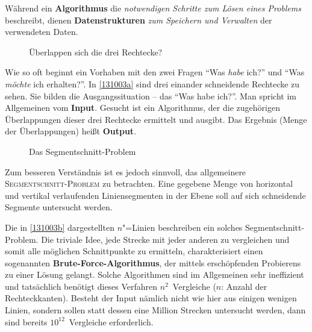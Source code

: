 \documentclass[ngerman,draft,parskip=half*,twoside]{scrreprt}
\theoremstyle{break}
\begin{document}
Während ein \textbf{Algorithmus} die \emph{notwendigen Schritte zum Lösen
eines Problems} beschreibt, dienen \textbf{Datenstrukturen}
\emph{zum Speichern und Verwalten} der verwendeten Daten.  

\begin{figure}
  \centering
%  
  \caption{Überlappen sich die drei Rechtecke?}
  \label{131003a}
\end{figure}

Wie so oft beginnt ein Vorhaben mit den zwei Fragen "`Was \emph{habe}
ich?"' und "`Was \emph{möchte} ich erhalten?"'. In \autoref{131003a}
sind drei einander schneidende Rechtecke zu sehen. Sie bilden die
Ausgangssituation -- das "`Was habe ich?"'. Man spricht im Allgemeinen vom
\textbf{Input}. Gesucht ist ein Algorithmus, der die zugehörigen
Überlappungen dieser drei Rechtecke ermittelt und ausgibt. Das Ergebnis (Menge der Überlappungen)
heißt \textbf{Output}.

\begin{figure}
  \centering
%  
  \caption{Das Segmentschnitt-Problem}
  \label{131003b}
\end{figure}

Zum besseren Verständnis ist es jedoch sinnvoll, das allgemeinere
\textsc{Segmentschnitt-Problem} zu betrachten. Eine
gegebene Menge von horizontal und vertikal verlaufenden Liniensegmenten
in der Ebene soll auf sich schneidende Segmente untersucht werden.

Die in \autoref{131003b} dargestellten $n$"=Linien beschreiben ein
solches Segmentschnitt-Problem. Die triviale Idee, jede Strecke mit jeder
anderen zu vergleichen und somit alle möglichen Schnittpunkte zu
ermitteln, charakterisiert einen sogenannten
\textbf{Brute-Force-Algorithmus}, der mittels erschöpfenden Probierens zu
einer Lösung gelangt. Solche Algorithmen sind im Allgemeinen sehr
ineffizient und tatsächlich benötigt dieses Verfahren $n^2$~Vergleiche
($n$: Anzahl der Rechteckkanten). Besteht der Input nämlich nicht wie
hier aus einigen wenigen Linien, sondern sollen statt dessen eine Million
Strecken untersucht werden, dann sind bereits $10^{12}$~Vergleiche
erforderlich.
\end{document}
